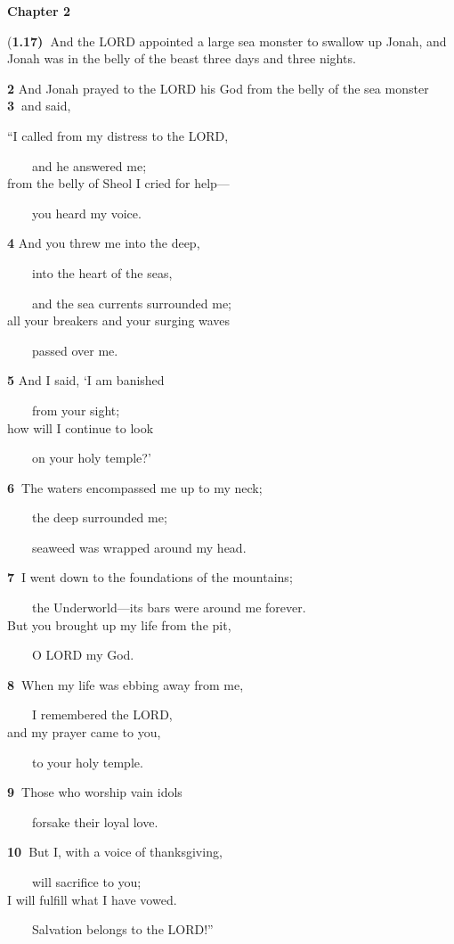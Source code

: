 \documentclass[
]{article}
\newcommand{\RL}[1]{\beginR #1\endR}
\begin{document}
\textbf{Chapter 2}

(\textbf{1.17)~}And the LORD appointed a large sea monster to swallow up
Jonah, and Jonah was in the belly of the beast three days and three
nights.

\textbf{2} And Jonah prayed to the LORD his God from the belly of the
sea monster \textbf{3~}and said,

\RL{``}I called from my distress to the LORD,\\
\strut ~~~~and he answered me;\\
from the belly of Sheol I cried for help---\\
\strut ~~~~you heard my voice.

\textbf{4} And you threw me into the deep,\\
\strut ~~~~into the heart of the seas,\\
\strut ~~~~and the sea currents surrounded me;\\
all your breakers and your surging waves\\
\strut ~~~~passed over me.

\textbf{5} And I said, \RL{`}I am banished\\
\strut ~~~~from your sight;\\
how will I continue to look\\
\strut ~~~~on your holy temple?\RL{'}

\textbf{6~}The waters encompassed me up to my neck;\\
\strut ~~~~the deep surrounded me;\\
\strut ~~~~seaweed was wrapped around my head.

\textbf{7~}I went down to the foundations of the mountains;\\
\strut ~~~~the Underworld---its bars were around me forever.\\
But you brought up my life from the pit,\\
\strut ~~~~O LORD my God.

\textbf{8~}When my life was ebbing away from me,\\
\strut ~~~~I remembered the LORD,\\
and my prayer came to you,\\
\strut ~~~~to your holy temple.

\textbf{9~}Those who worship vain idols\\
\strut ~~~~forsake their loyal love.

\textbf{10~}But I, with a voice of thanksgiving,\\
\strut ~~~~will sacrifice to you;\\
I will fulfill what I have vowed.\\
\strut ~~~~Salvation belongs to the LORD!''
\end{document}
